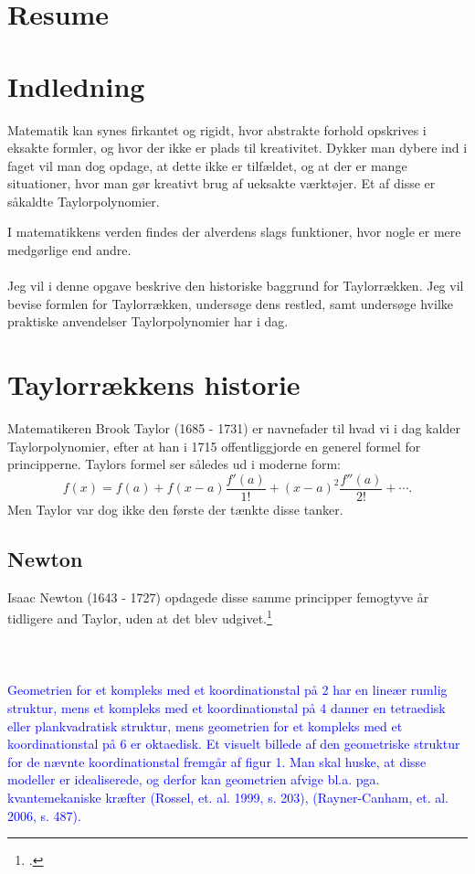 \documentclass[12pt, a4paper]{article}
\begin{document}
\section*{Resume} %
\blindtext[1-2]
\tableofcontents
\newpage



\section{Indledning} %
Matematik kan synes firkantet og rigidt, hvor abstrakte forhold opskrives i eksakte formler, og hvor der ikke er plads til kreativitet. 
Dykker man dybere ind i faget vil man dog opdage, at dette ikke er tilfældet, og at der er mange situationer, hvor man gør kreativt brug af ueksakte værktøjer. Et af disse er såkaldte Taylorpolynomier.


I matematikkens verden findes der alverdens slags funktioner, hvor nogle er mere medgørlige end andre.\\
\\
Jeg vil i denne opgave beskrive den historiske baggrund for Taylorrækken. Jeg vil bevise formlen for Taylorrækken, undersøge dens restled, samt undersøge hvilke praktiske anvendelser Taylorpolynomier har i dag.

\section{Taylorrækkens historie} %
Matematikeren Brook Taylor (1685 - 1731) er navnefader til hvad vi i dag kalder Taylorpolynomier, efter at han i 1715 offentliggjorde en generel formel for principperne.
Taylors formel ser således ud i moderne form:
\begin{equation}
   f(x)=f(a)+f(x-a)\frac{f'(a)}{1!}+(x-a)^2\frac{f''(a)}{2!}+\cdots. 
\end{equation}
Men Taylor var dog ikke den første der tænkte disse tanker.
\subsection{Newton}

Isaac Newton (1643 - 1727) opdagede disse samme principper femogtyve år tidligere and Taylor, uden at det blev udgivet.\footcite[s. 247]{roy_2021}\\
\\
\\
\\
\textcolor{blue}{Geometrien for et kompleks med et koordinationstal på 2 har en lineær rumlig struktur, mens et kompleks med et koordinationstal på 4 danner en tetraedisk eller plankvadratisk struktur, mens geometrien for et kompleks med et koordinationstal på 6 er oktaedisk. Et visuelt billede af den geometriske struktur for de nævnte koordinationstal fremgår af figur 1. Man skal huske, at disse modeller er idealiserede, og derfor kan geometrien afvige bl.a. pga. kvantemekaniske kræfter (Rossel, et. al. 1999, s. 203), (Rayner-Canham, et. al. 2006, s. 487).}
\end{document}
